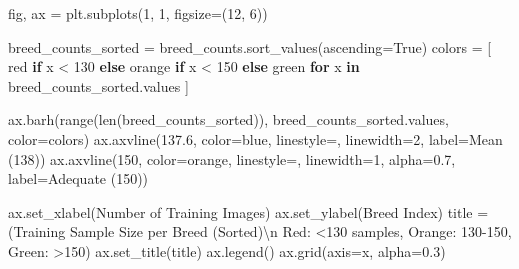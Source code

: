 \documentclass[
  letterpaper,
  DIV=11,
  numbers=noendperiod]{scrartcl}
\newenvironment{Shaded}{\begin{snugshade}}{\end{snugshade}}
\newcommand{\BuiltInTok}[1]{\textcolor[rgb]{0.00,0.23,0.31}{#1}}
\newcommand{\CharTok}[1]{\textcolor[rgb]{0.13,0.47,0.30}{#1}}
\newcommand{\ControlFlowTok}[1]{\textcolor[rgb]{0.00,0.23,0.31}{\textbf{#1}}}
\newcommand{\DecValTok}[1]{\textcolor[rgb]{0.68,0.00,0.00}{#1}}
\newcommand{\FloatTok}[1]{\textcolor[rgb]{0.68,0.00,0.00}{#1}}
\newcommand{\KeywordTok}[1]{\textcolor[rgb]{0.00,0.23,0.31}{\textbf{#1}}}
\newcommand{\NormalTok}[1]{\textcolor[rgb]{0.00,0.23,0.31}{#1}}
\newcommand{\OperatorTok}[1]{\textcolor[rgb]{0.37,0.37,0.37}{#1}}
\newcommand{\StringTok}[1]{\textcolor[rgb]{0.13,0.47,0.30}{#1}}
\newcommand{\VariableTok}[1]{\textcolor[rgb]{0.07,0.07,0.07}{#1}}
\renewenvironment{Shaded}{%
  \begin{tcolorbox}[%
    enhanced,%
    colback=codebg,%
    colframe=codebg,%
    borderline west={3pt}{0pt}{sectionblue},%
    boxrule=0pt,%
    arc=0pt,%
    boxsep=5pt,%
    left=2mm,%
    right=2mm,%
    top=2mm,%
    bottom=2mm%
  ]%
}{%
  \end{tcolorbox}%
}
\begin{document}
\begin{Shaded}
\begin{Highlighting}[]
\NormalTok{fig, ax }\OperatorTok{=}\NormalTok{ plt.subplots(}\DecValTok{1}\NormalTok{, }\DecValTok{1}\NormalTok{, figsize}\OperatorTok{=}\NormalTok{(}\DecValTok{12}\NormalTok{, }\DecValTok{6}\NormalTok{))}

\NormalTok{breed\_counts\_sorted }\OperatorTok{=}\NormalTok{ breed\_counts.sort\_values(ascending}\OperatorTok{=}\VariableTok{True}\NormalTok{)}
\NormalTok{colors }\OperatorTok{=}\NormalTok{ [}
    \StringTok{\textquotesingle{}red\textquotesingle{}} \ControlFlowTok{if}\NormalTok{ x }\OperatorTok{\textless{}} \DecValTok{130} \ControlFlowTok{else} \StringTok{\textquotesingle{}orange\textquotesingle{}} \ControlFlowTok{if}\NormalTok{ x }\OperatorTok{\textless{}} \DecValTok{150} \ControlFlowTok{else} \StringTok{\textquotesingle{}green\textquotesingle{}}
    \ControlFlowTok{for}\NormalTok{ x }\KeywordTok{in}\NormalTok{ breed\_counts\_sorted.values}
\NormalTok{]}

\NormalTok{ax.barh(}\BuiltInTok{range}\NormalTok{(}\BuiltInTok{len}\NormalTok{(breed\_counts\_sorted)), }
\NormalTok{        breed\_counts\_sorted.values, color}\OperatorTok{=}\NormalTok{colors)}
\NormalTok{ax.axvline(}\FloatTok{137.6}\NormalTok{, color}\OperatorTok{=}\StringTok{\textquotesingle{}blue\textquotesingle{}}\NormalTok{, linestyle}\OperatorTok{=}\StringTok{\textquotesingle{}{-}{-}\textquotesingle{}}\NormalTok{, }
\NormalTok{           linewidth}\OperatorTok{=}\DecValTok{2}\NormalTok{, label}\OperatorTok{=}\StringTok{\textquotesingle{}Mean (138)\textquotesingle{}}\NormalTok{)}
\NormalTok{ax.axvline(}\DecValTok{150}\NormalTok{, color}\OperatorTok{=}\StringTok{\textquotesingle{}orange\textquotesingle{}}\NormalTok{, linestyle}\OperatorTok{=}\StringTok{\textquotesingle{}{-}{-}\textquotesingle{}}\NormalTok{, }
\NormalTok{           linewidth}\OperatorTok{=}\DecValTok{1}\NormalTok{, alpha}\OperatorTok{=}\FloatTok{0.7}\NormalTok{, label}\OperatorTok{=}\StringTok{\textquotesingle{}Adequate (150)\textquotesingle{}}\NormalTok{)}

\NormalTok{ax.set\_xlabel(}\StringTok{\textquotesingle{}Number of Training Images\textquotesingle{}}\NormalTok{)}
\NormalTok{ax.set\_ylabel(}\StringTok{\textquotesingle{}Breed Index\textquotesingle{}}\NormalTok{)}
\NormalTok{title }\OperatorTok{=}\NormalTok{ (}\StringTok{\textquotesingle{}Training Sample Size per Breed (Sorted)}\CharTok{\textbackslash{}n}\StringTok{\textquotesingle{}}
         \StringTok{\textquotesingle{}Red: \textless{}130 samples, Orange: 130{-}150, Green: \textgreater{}150\textquotesingle{}}\NormalTok{)}
\NormalTok{ax.set\_title(title)}
\NormalTok{ax.legend()}
\NormalTok{ax.grid(axis}\OperatorTok{=}\StringTok{\textquotesingle{}x\textquotesingle{}}\NormalTok{, alpha}\OperatorTok{=}\FloatTok{0.3}\NormalTok{)}


\end{Highlighting}
\end{Shaded}
\end{document}
